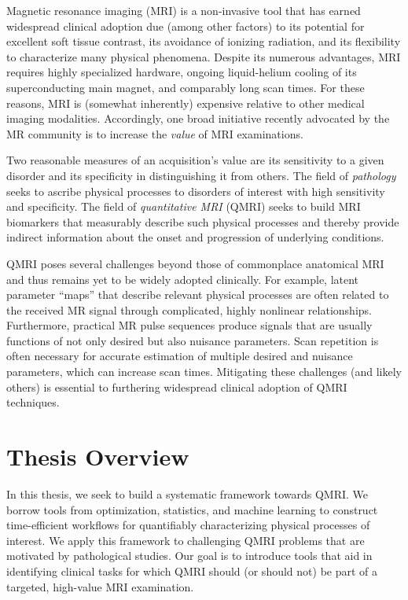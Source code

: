 
Magnetic resonance imaging (MRI)
is a non-invasive tool
that has earned widespread clinical adoption
due (among other factors) 
to its potential for excellent soft tissue contrast,
its avoidance of ionizing radiation,
and its flexibility to characterize many physical phenomena. 
Despite its numerous advantages,
MRI requires highly specialized hardware,
ongoing liquid-helium cooling
of its superconducting main magnet,
and comparably long scan times.
For these reasons,
MRI is (somewhat inherently) expensive relative
to other medical imaging modalities.
Accordingly,
one broad initiative 
recently advocated by the MR community 
is to increase the \emph{value}
of MRI examinations.

Two reasonable measures
of an acquisition's value
are its sensitivity
to a given disorder
and its specificity
in distinguishing it
from others.
The field of \emph{pathology}
seeks to ascribe physical processes
to disorders of interest
with high sensitivity and specificity.
The field of \emph{quantitative MRI} (QMRI)
seeks to build MRI biomarkers
that measurably describe such physical processes
and thereby provide indirect information
about the onset and progression
of underlying conditions.

QMRI poses several challenges
beyond those of commonplace anatomical MRI
and thus remains yet to be widely adopted clinically.
For example, latent parameter ``maps'' 
that describe relevant physical processes
are often related to the received MR signal
through complicated, 
highly nonlinear relationships. 
Furthermore,
practical MR pulse sequences
produce signals
that are usually functions
of not only desired
but also nuisance parameters.
Scan repetition is often necessary
for accurate estimation
of multiple desired and nuisance parameters,
which can increase scan times.
Mitigating these challenges 
(and likely others)
is essential
to furthering widespread clinical adoption
of QMRI techniques.

\section{Thesis Overview}
\label{s,intro,over}

In this thesis,
we seek to build a systematic framework
towards QMRI.
We borrow tools
from optimization, statistics, and machine learning
to construct time-efficient workflows
for quantifiably characterizing
physical processes of interest.
We apply this framework
to challenging QMRI problems
that are motivated
by pathological studies.
Our goal is to introduce tools 
that aid in identifying clinical tasks 
for which QMRI should
(or should not) be part
of a targeted, high-value MRI examination.

